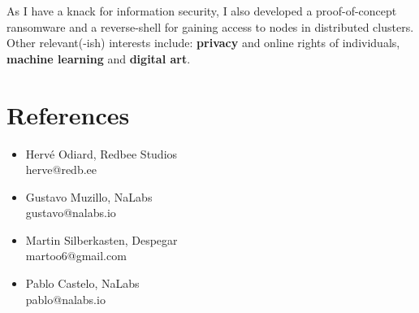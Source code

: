 \documentclass{vitae}
\begin{document}
As I have a knack for information security, I also developed a proof-of-concept ransomware and a reverse-shell for gaining access to nodes in distributed clusters.
Other relevant(-ish) interests include: {\bf privacy} and online rights of individuals, {\bf machine learning} and {\bf digital art}.

\section*{References}
\begin{multicols}{2}
    \begin{itemize}
    \item Hervé Odiard, Redbee Studios\\
    herve@redb.ee
    \item Gustavo Muzillo, NaLabs\\
    gustavo@nalabs.io
    \item Martin Silberkasten, Despegar\\
    martoo6@gmail.com
    \item Pablo Castelo, NaLabs\\
    pablo@nalabs.io
    \end{itemize}
\end{multicols}
\end{document}
